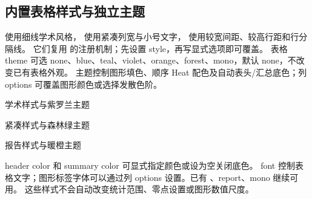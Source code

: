 \subsection{内置表格样式与独立主题}
 使用细线学术风格， 使用紧凑列宽与小号文字， 使用较宽间距、较高行距和行分隔线。
它们复用  的注册机制；先设置 style，再写显式选项即可覆盖。
表格 theme 可选 none、blue、teal、violet、orange、forest、mono，默认 none，不改变已有表格外观。
主题控制图形填色、顺序 Heat 配色及自动表头/汇总底色；列 options 可覆盖图形颜色或选择发散色阶。
\begin{example}[text and listing,sidebyside=false]{学术样式与紫罗兰主题}
\begin{center}
\begin{gradtable}[align=c,header align=c,style=academic,theme=violet,width=\linewidth]
\end{gradtable}
\end{center}
\end{example}
\begin{example}[text and listing,sidebyside=false]{紧凑样式与森林绿主题}
\begin{center}
\begin{gradtable}[align=c,header align=c,style=compact,theme=forest,width=\linewidth]
\end{gradtable}
\end{center}
\end{example}
\begin{example}[text and listing,sidebyside=false]{报告样式与暖橙主题}
\begin{center}
\begin{gradtable}[align=c,header align=c,style=dashboard,theme=orange,width=\linewidth]
\end{gradtable}
\end{center}
\end{example}
header color 和 summary color 可显式指定颜色或设为空关闭底色。
font 控制表格文字；图形标签字体可以通过列 options 设置。已有 、report、mono 继续可用。
这些样式不会自动改变统计范围、零点设置或图形数值尺度。

